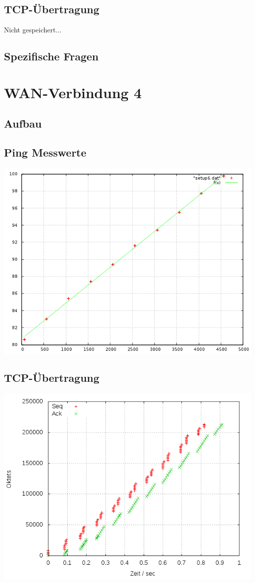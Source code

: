 \documentclass[a4paper,10pt]{article}
\begin{document}
\subsection{TCP-Übertragung}
Nicht gespeichert...

\subsection{Spezifische Fragen}


\section{WAN-Verbindung 4}

\subsection{Aufbau}

\subsection{Ping Messwerte}
\includegraphics[scale=0.75]{ping_setup_wan4.png}

\subsection{TCP-Übertragung}
\includegraphics[scale=0.75]{setup_wan4.png}
\end{document}
